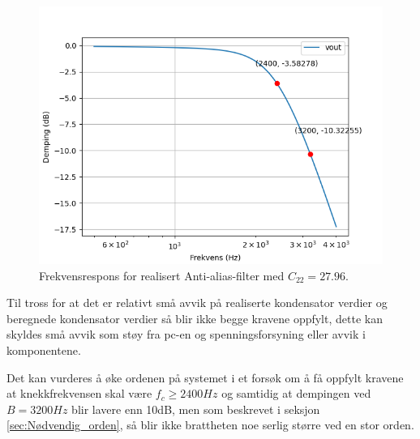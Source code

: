 \begin{figure}[!hbt]
	\centering
	\includegraphics[scale=0.45]{./Images/03Research/02frekvensrespons2.png}
	\caption{Frekvensrespons for realisert Anti-alias-filter med  $C_{22}=27.96$.}
	\label{fig:02frekvensresponsrealisert2}
\end{figure}

Til tross for at det er relativt små avvik på realiserte kondensator verdier og beregnede kondensator verdier så blir ikke begge kravene oppfylt, dette kan skyldes små avvik som støy fra pc-en og spenningsforsyning eller avvik i komponentene.

Det kan vurderes å øke ordenen på systemet i et forsøk om å få oppfylt kravene at knekkfrekvensen skal være $f_c\geq2400Hz$ og samtidig at dempingen ved $B=3200Hz$ blir lavere enn 10dB, men som beskrevet i seksjon \ref{sec:Nødvendig_orden}, så blir ikke brattheten noe serlig større ved en stor orden.

